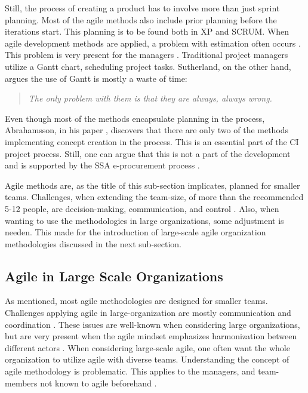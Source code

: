 Still, the process of creating a product has to involve more than just sprint planning. Most of the agile methods also include prior planning before the iterations start. This planning is to be found both in XP and SCRUM. When agile development methods are applied, a problem with estimation often occurs \cite{lang2013cost}. This problem is very present for the managers \cite{dybaa2008empirical}. Traditional project managers utilize a Gantt chart, scheduling project tasks. Sutherland, on the other hand, argues the use of Gantt is mostly a waste of time:
\begin{quote}
    \textit{The only problem with them is that they are always, always wrong.}
\end{quote}
Even though most of the methods encapsulate planning in the process, Abrahamsson, in his paper \cite{abrahamsson2017agile}, discovers that there are only two of the methods implementing concept creation in the process. This is an essential part of the CI project process. Still, one can argue that this is not a part of the development and is supported by the SSA e-procurement process \cite{e-procurement-process}. 

Agile methods are, as the title of this sub-section implicates, planned for smaller teams. Challenges, when extending the team-size, of more than the recommended 5-12 people, are decision-making, communication, and control \cite{xu2009coordination}. Also, when wanting to use the methodologies in large organizations, some adjustment is needen. This made for the introduction of large-scale agile organization methodologies discussed in the next sub-section.  

\subsection{Agile in Large Scale Organizations}
As mentioned, most agile methodologies are designed for smaller teams. Challenges applying agile in large-organization are mostly communication and coordination \cite{dingsoyr2013research}. These issues are well-known when considering large organizations, but are very present when the agile mindset emphasizes harmonization between different actors \cite{miller2002harmonization}. 
When considering large-scale agile, one often want the whole organization to utilize agile with diverse teams. Understanding the concept of agile methodology is problematic. This applies to the managers, and team-members not known to agile beforehand \cite{svorstol2017tailoring}.

